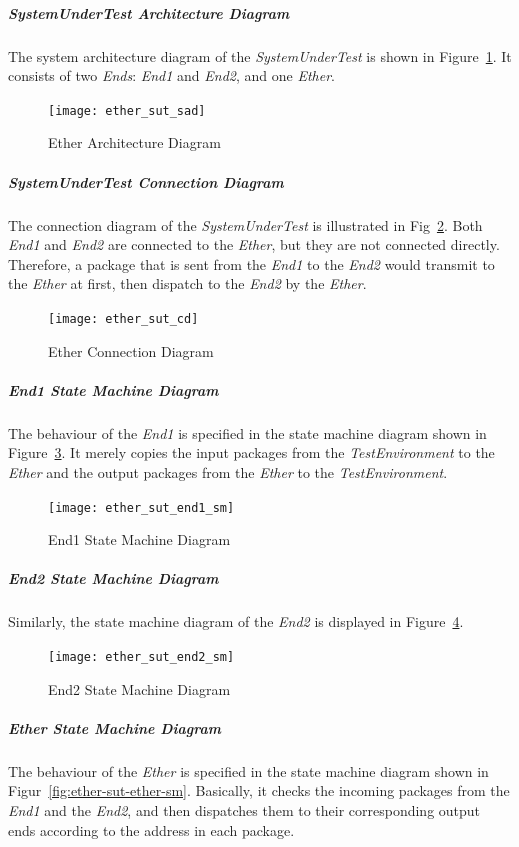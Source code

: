 \subparagraph{SystemUnderTest Architecture Diagram}
The system architecture diagram of the \emph{SystemUnderTest} is shown in Figure~\ref{fig:ether-sut-sad}. It consists of two \emph{Ends}: \emph{End1} and \emph{End2}, and one \emph{Ether}.
\begin{figure}[htb!]
    \centering
    \texttt{[image: ether\_sut\_sad]}
    \caption{Ether Architecture Diagram}
    \label{fig:ether-sut-sad}
\end{figure}

\subparagraph{SystemUnderTest Connection Diagram}
The connection diagram of the \emph{SystemUnderTest} is illustrated in Fig~\ref{fig:ether-cd}. Both \emph{End1} and \emph{End2} are connected to the \emph{Ether}, but they are not connected directly. Therefore, a package that is sent from the \emph{End1} to the \emph{End2} would transmit to the \emph{Ether} at first, then dispatch to the \emph{End2} by the \emph{Ether}. 

\begin{figure}[htb!]
    \centering
    \texttt{[image: ether\_sut\_cd]}
    \caption{Ether Connection Diagram}
    \label{fig:ether-cd}
\end{figure}

\subparagraph{End1 State Machine Diagram}
The behaviour of the \emph{End1} is specified in the state machine diagram shown in Figure~\ref{fig:ether-sut-end1-sm}. It merely copies the input packages from the \emph{TestEnvironment} to the \emph{Ether} and the output packages from the \emph{Ether} to the \emph{TestEnvironment}.

\begin{figure}[htb!]
    \centering
	\texttt{[image: ether\_sut\_end1\_sm]}
    \caption{End1 State Machine Diagram}
    \label{fig:ether-sut-end1-sm}
\end{figure}

\subparagraph{End2 State Machine Diagram}
Similarly, the state machine diagram of the \emph{End2} is displayed in Figure~\ref{fig:ether-sut-end2-sm}.

\begin{figure}[htb!]
    \centering
	\texttt{[image: ether\_sut\_end2\_sm]}
    \caption{End2 State Machine Diagram}
    \label{fig:ether-sut-end2-sm}
\end{figure}

\subparagraph{Ether State Machine Diagram}
The behaviour of the \emph{Ether} is specified in the state machine diagram shown in Figur~\ref{fig:ether-sut-ether-sm}. Basically, it checks the incoming packages from the \emph{End1} and the \emph{End2}, and then dispatches them to their corresponding output ends according to the address in each package.

